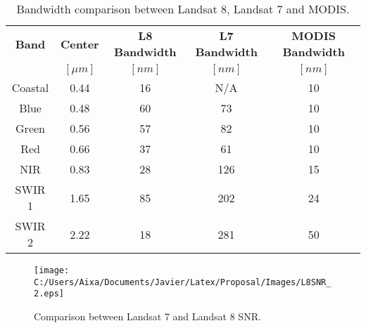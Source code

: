 \begin{table}[!ht]
\caption{ Bandwidth comparison between Landsat 8, Landsat 7 and MODIS. \label{tab:bandwidth}} 
\centering
      \begin{tabular}{c|c|c|c|c}
          \bfseries{Band}& \bfseries{Center}   & \bfseries{L8 Bandwidth} & \bfseries{L7 Bandwidth} & \bfseries{MODIS Bandwidth} \\ 
                  & \bfseries{$[\mu m]$} & $[nm]$   & $[nm]$ & $[nm]$   \\ \hline \hline
          Coastal & 0.44 & 16 & N/A & 10  \\
          Blue    & 0.48 & 60 & 73  & 10  \\
          Green   & 0.56 & 57 & 82  & 10  \\
          Red     & 0.66 & 37 & 61  & 10  \\  
          NIR     & 0.83 & 28 & 126 & 15  \\
          SWIR 1  & 1.65 & 85 & 202 & 24  \\
          SWIR 2  & 2.22 & 18 & 281 & 50  \\ 
       \end{tabular}
\end{table}

\begin{figure}[htb]
\centering
      \texttt{[image: C:/Users/Aixa/Documents/Javier/Latex/Proposal/Images/L8SNR\_2.eps]}
      \caption{Comparison between Landsat 7 and Landsat 8 SNR. \label{fig:L8SNR} } 
      \label{fig:olisnr}
\end{figure}


